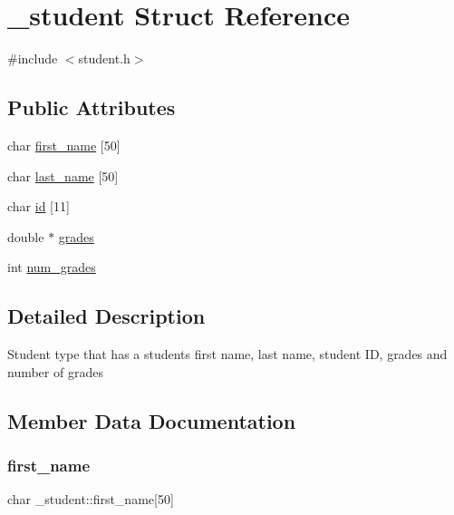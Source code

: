 \hypertarget{struct__student}{}\section{\+\_\+student Struct Reference}
\label{struct__student}


{\ttfamily \#include $<$student.\+h$>$}

\subsection*{Public Attributes}
\begin{DoxyCompactItemize}
\item 
char \mbox{\hyperlink{struct__student_a272ec3136434e8d3281a615cf31cc987}{first\+\_\+name}} \mbox{[}50\mbox{]}
\item 
char \mbox{\hyperlink{struct__student_a18eb2a90671a2292c017b8f4fbde7eec}{last\+\_\+name}} \mbox{[}50\mbox{]}
\item 
char \mbox{\hyperlink{struct__student_adaee78078859cdecdbe9128dd655b748}{id}} \mbox{[}11\mbox{]}
\item 
double $\ast$ \mbox{\hyperlink{struct__student_ad0f75a9ff0f6104eb9e3bb3c4f7ad97b}{grades}}
\item 
int \mbox{\hyperlink{struct__student_a6592ee968ed2226737f45243e7602636}{num\+\_\+grades}}
\end{DoxyCompactItemize}


\subsection{Detailed Description}
Student type that has a student\textquotesingle{}s first name, last name, student ID, grades and number of grades 

\subsection{Member Data Documentation}
\mbox{\label{struct__student_a272ec3136434e8d3281a615cf31cc987}} 
\subsubsection{\texorpdfstring{first\+\_\+name}{first\_name}}
{\footnotesize\ttfamily char \+\_\+student\+::first\+\_\+name\mbox{[}50\mbox{]}}

